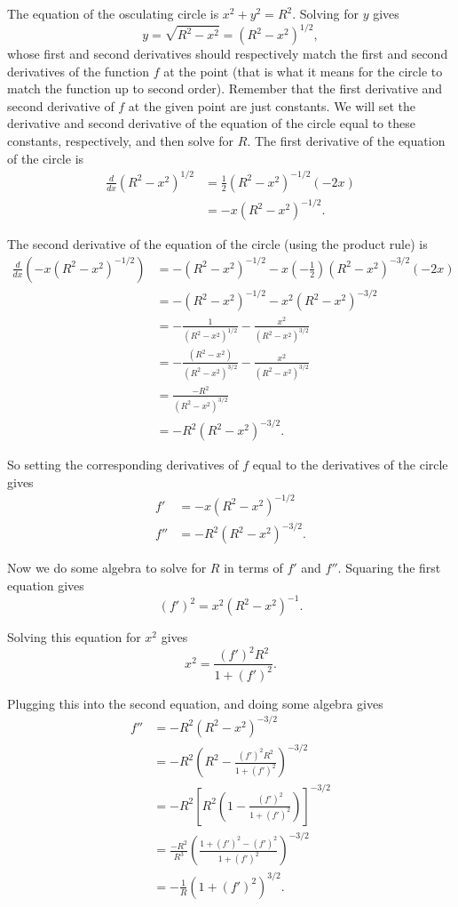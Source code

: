 \documentclass[twoside,openright,titlepage,a4paper]{book}
\begin{document}
\begin{sloppypar}
The equation of the osculating circle is $x^2+y^2 = R^2$. Solving for $y$ gives \[ y = \sqrt{R^2-x^2} = (R^2-x^2)^{1/2}, \] whose first and second derivatives should respectively match the first and second derivatives of the function $f$ at the point (that is what it means for the circle to match the function up to second order). Remember that the first derivative and second derivative of $f$ at the given point are just constants. We will set the derivative and second derivative of the equation of the circle equal to these constants, respectively, and then solve for $R$.
The first derivative of the equation of the circle is 
\begin{align*}
\frac{d}{dx} (R^2-x^2)^{1/2} &= \frac{1}{2}(R^2-x^2)^{-1/2}(-2x) \\
&= -x(R^2-x^2)^{-1/2}. 
\end{align*}

The second derivative of the equation of the circle (using the product rule) is
\begin{align*}
\frac{d}{dx} \left(-x(R^2-x^2)^{-1/2} \right) &= -(R^2-x^2)^{-1/2} - x \left(-\frac{1}{2}\right)(R^2-x^2)^{-3/2}(-2x) \\
&= -(R^2-x^2)^{-1/2} - x^2 (R^2-x^2)^{-3/2} \\
&= - \frac{1}{(R^2-x^2)^{1/2}} - \frac{x^2}{(R^2-x^2)^{3/2}} \\
&= - \frac{\left(R^2-x^2\right)}{(R^2-x^2)^{3/2}} - \frac{x^2}{(R^2-x^2)^{3/2}} \\
&= \frac{-R^2}{(R^2-x^2)^{3/2}} \\
&= -R^2 (R^2-x^2)^{-3/2}.
\end{align*}

So setting the corresponding derivatives of $f$ equal to the derivatives of the circle gives
\begin{align*}
f' &= -x(R^2 - x^2)^{-1/2} \\
f'' &= -R^2(R^2-x^2)^{-3/2}. 
\end{align*}

Now we do some algebra to solve for $R$ in terms of $f'$ and $f''$. Squaring the first equation gives \[ (f')^2 = x^2(R^2-x^2)^{-1}. \]

Solving this equation for $x^2$ gives \[ x^2 = \frac{(f')^2 R^2}{1+(f')^2}. \]

Plugging this into the second equation, and doing some algebra gives
\begin{align*}
f'' &= -R^2(R^2-x^2)^{-3/2} \\
&= -R^2 \left( R^2 - \frac{(f')^2 R^2}{1+(f')^2} \right)^{-3/2} \\
&= -R^2 \left[ R^2 \left(1-\frac{(f')^2}{1+(f')^2} \right)\right]^{-3/2} \\
&= \frac{-R^2}{R^3} \left(\frac{1+(f')^2 - (f')^2}{1+(f')^2}\right)^{-3/2} \\
&= -\frac{1}{R} \left(1+(f')^2 \right)^{3/2}.
\end{align*}


\end{sloppypar}
\end{document}

